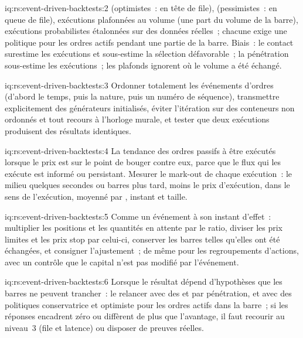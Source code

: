 \begin{solution}{iq:rs:event-driven-backtests:2}
 (optimistes~: en tête de file),  (pessimistes~: en queue de file), exécutions plafonnées au volume (une part du volume de la barre),
exécutions probabilistes étalonnées sur des données réelles~; chacune exige une politique pour les ordres actifs pendant une partie de la barre. Biais~: le contact surestime les exécutions et sous-estime
la sélection défavorable~; la pénétration sous-estime les exécutions~; les plafonds ignorent où le volume a été échangé.
\end{solution}

\begin{solution}{iq:rs:event-driven-backtests:3}
Ordonner totalement les événements d'ordres (d'abord le temps, puis la nature, puis un numéro de séquence), transmettre explicitement des générateurs initialisés, éviter l'itération sur des conteneurs non ordonnés et tout recours
à l'horloge murale, et tester que deux exécutions produisent des résultats identiques.
\end{solution}

\begin{solution}{iq:rs:event-driven-backtests:4}
La tendance des ordres passifs à être exécutés lorsque le prix est sur le point de bouger contre eux, parce que le flux qui les exécute est informé ou persistant.
Mesurer le mark-out de chaque exécution~: le milieu quelques secondes ou barres plus tard, moins le prix d'exécution, dans le sens de l'exécution, moyenné par , instant et taille.
\end{solution}

\begin{solution}{iq:rs:event-driven-backtests:5}
Comme un événement à son instant d'effet~: multiplier les positions et les quantités en attente par le ratio, diviser les prix limites et les prix stop par celui-ci, conserver les barres telles qu'elles ont été échangées, et consigner
l'ajustement~; de même pour les regroupements d'actions, avec un contrôle que le capital n'est pas modifié par l'événement.
\end{solution}

\begin{solution}{iq:rs:event-driven-backtests:6}
Lorsque le résultat dépend d'hypothèses que les barres ne peuvent trancher~: le relancer avec des  et par pénétration, et avec des politiques conservatrice et optimiste pour les ordres actifs dans la barre~;
si les réponses encadrent zéro ou diffèrent de plus que l'avantage, il faut recourir au niveau~3 (file et latence) ou disposer de preuves réelles.
\end{solution}
